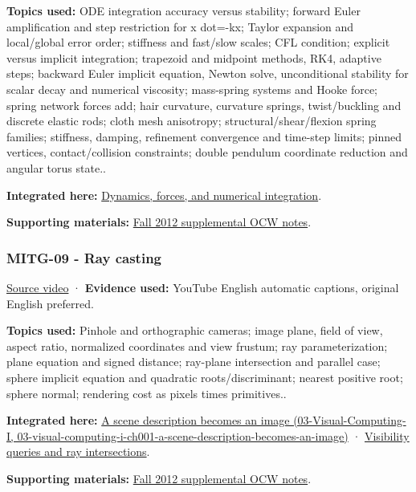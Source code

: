\textbf{Topics used:} ODE integration accuracy versus stability; forward Euler amplification and step restriction for x dot=-kx; Taylor expansion and local/global error order; stiffness and fast/slow scales; CFL condition; explicit versus implicit integration; trapezoid and midpoint methods, RK4, adaptive steps; backward Euler implicit equation, Newton solve, unconditional stability for scalar decay and numerical viscosity; mass-spring systems and Hooke force; spring network forces add; hair curvature, curvature springs, twist/buckling and discrete elastic rods; cloth mesh anisotropy; structural/shear/flexion spring families; stiffness, damping, refinement convergence and time-step limits; pinned vertices, contact/collision constraints; double pendulum coordinate reduction and angular torus state..

\textbf{Integrated here:} \hyperref[04-visual-computing-ii-ch029-dynamics-forces-and-numerical-integration]{Dynamics, forces, and numerical integration}.

\textbf{Supporting materials:} \href{https://ocw.mit.edu/courses/6-837-computer-graphics-fall-2012/pages/lecture-notes/}{Fall 2012 supplemental OCW notes}.

\subsubsection{MITG-09 - Ray casting}\label{04-visual-computing-ii-ch036-mitg-09---ray-casting}

\href{https://www.youtube.com/watch?v=mJHGcDc37kY}{Source video} · \textbf{Evidence used:} YouTube English automatic captions, original English preferred.

\textbf{Topics used:} Pinhole and orthographic cameras; image plane, field of view, aspect ratio, normalized coordinates and view frustum; ray parameterization; plane equation and signed distance; ray-plane intersection and parallel case; sphere implicit equation and quadratic roots/discriminant; nearest positive root; sphere normal; rendering cost as pixels times primitives..

\textbf{Integrated here:} \href{../03-Visual-Computing-I/main.pdf\#nameddest=03-visual-computing-i-ch001-a-scene-description-becomes-an-image}{A scene description becomes an image (03-Visual-Computing-I, 03-visual-computing-i-ch001-a-scene-description-becomes-an-image)} · \hyperref[04-visual-computing-ii-ch028-visibility-queries-and-ray-intersections-1]{Visibility queries and ray intersections}.

\textbf{Supporting materials:} \href{https://ocw.mit.edu/courses/6-837-computer-graphics-fall-2012/pages/lecture-notes/}{Fall 2012 supplemental OCW notes}.

